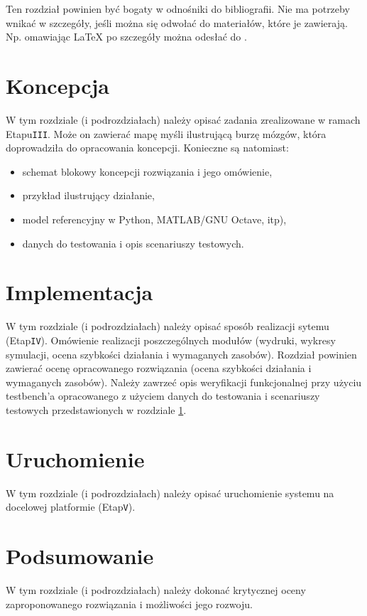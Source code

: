\documentclass[a4paper,titleauthor]{mwart}
\begin{document}
Ten rozdział powinien być bogaty w odnośniki do bibliografii. Nie ma potrzeby wnikać w szczegóły, jeśli można się odwołać do materiałów, które je zawierają. Np. omawiając LaTeX po szczegóły można odesłać do \cite{WikiLatex}.

\section{Koncepcja}
\label{sec:koncepcja}

W tym rozdziale (i podrozdziałach) należy opisać zadania zrealizowane w ramach Etapu\texttt{III}. Może on zawierać mapę myśli ilustrującą burzę mózgów, która doprowadziła do opracowania koncepcji. Konieczne są natomiast:

\begin{itemize}
	\item schemat blokowy koncepcji rozwiązania i jego omówienie,
	\item przykład ilustrujący działanie,
	\item model referencyjny w Python, MATLAB/GNU Octave, itp),
	\item danych do testowania i opis scenariuszy testowych.
\end{itemize}



\section{Implementacja}
\label{sec:implementacja}

W tym rozdziale (i podrozdziałach) należy opisać sposób realizacji sytemu (Etap\texttt{IV}). Omówienie realizacji poszczególnych modułów (wydruki, wykresy symulacji, ocena szybkości działania i wymaganych zasobów). Rozdział powinien zawierać ocenę opracowanego rozwiązania (ocena szybkości działania i wymaganych zasobów). Należy zawrzeć opis weryfikacji funkcjonalnej przy użyciu testbench'a opracowanego z użyciem danych do testowania i scenariuszy testowych przedstawionych w rozdziale \ref*{sec:koncepcja}.

\section{Uruchomienie}
\label{sec:uruchomienie}

W tym rozdziale (i podrozdziałach) należy opisać uruchomienie systemu na docelowej platformie (Etap\texttt{V}). 
	
\section{Podsumowanie}
\label{sec:podsumowanie}

W tym rozdziale (i podrozdziałach) należy dokonać krytycznej oceny zaproponowanego rozwiązania i możliwości jego rozwoju. 



	
\end{document}
